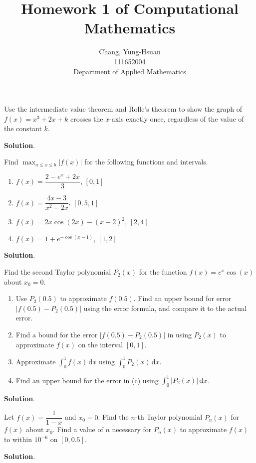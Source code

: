 \documentclass[11pt]{article}
\title{Homework 1 of Computational Mathematics}
\author{Chang, Yung-Hsuan\\111652004\\Department of Applied Mathematics}
\theoremstyle{break}
\newcommand{\ddi}{\text{$\,$d}}
\numberwithin{equation}{theorem}
\begin{document}
\maketitle
\thispagestyle{empty}
\newpage
{}

\begin{problem}
    Use the intermediate value theorem and Rolle's theorem to show the graph of $f(x)=x^3+2x+k$ crosses the $x$-axis exactly once, regardless of the value of the constant $k$.
\end{problem}
\textbf{Solution}.

\begin{problem}
    Find $\displaystyle\max_{a\leq x\leq b}|f(x)|$ for the following functions and intervals.
    \begin{enumerate}
        \item $f(x)=\dfrac{2-e^x+2x}{3}$, $[0, 1]$
        \item $f(x)=\dfrac{4x-3}{x^2-2x}$, $[0,5, 1]$
        \item $f(x)=2x\cos(2x)-(x-2)^2$, $[2, 4]$
        \item $f(x)=1+e^{-\cos(x-1)}$, $[1, 2]$
    \end{enumerate}
\end{problem}
\textbf{Solution}.

\begin{problem}
    Find the second Taylor polynomial $P_2(x)$ for the function $f(x)=e^x\cos(x)$ about $x_0=0$.
    \begin{enumerate}
        \item Use $P_2(0.5)$ to approximate $f(0.5)$. Find an upper bound for error $|f(0.5)-P_2(0.5)|$ using the error formula, and compare it to the actual error.
        \item Find a bound for the error $|f(0.5)-P_2(0.5)|$ in using $P_2(x)$ to approximate $f(x)$ on the interval $[0, 1]$.
        \item Approximate $\displaystyle\int_{0}^{1}f(x)\ddi x$ using $\displaystyle\int_{0}^{1}P_2(x)\ddi x$.
        \item Find an upper bound for the error in (c) using $\displaystyle\int_{0}^{1}|P_2(x)|\ddi x$.
    \end{enumerate}
\end{problem}
\textbf{Solution}.

\begin{problem}
    Let $f(x)=\dfrac{1}{1-x}$ and $x_0=0$. Find the $n$-th Taylor polynomial $P_n(x)$ for $f(x)$ about $x_0$. Find a value of $n$ necessary for $P_n(x)$ to approximate $f(x)$ to within $10^{-6}$ on $[0, 0.5]$.
\end{problem}
\textbf{Solution}.
\end{document}
